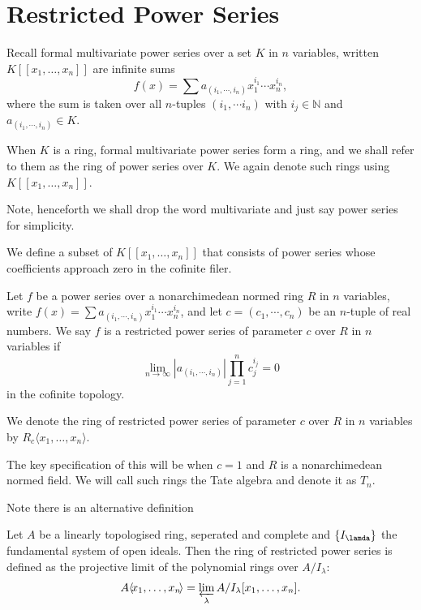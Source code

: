 \chapter{Restricted Power Series}

Recall formal multivariate power series over a set $K$ in $n$ variables, written
$K [ \! [ x_1, \dots, x_n ] \! ]$ are infinite sums
\[
  f(x) = \sum a_{(i_1, \cdots, i_n)} x_1^{i_1} \cdots x_n^{i_n},
\]
where the sum is taken over all $n$-tuples $(i_1, \cdots i_n)$ with $i_j \in \mathbb{N}$ and
$a_{(i_1, \cdots, i_n)} \in K$.

When $K$ is a ring, formal multivariate power series form a ring, and we shall refer to them as the
ring of power series over $K$.  We again denote such rings using $K [ \! [ x_1, \dots, x_n ] \! ]$.

Note, henceforth we shall drop the word multivariate and just say power series for simplicity.

We define a subset of $K [ \! [ x_1, \dots, x_n ] \! ]$ that consists of power series whose coefficients
approach zero in the cofinite filer.

\begin{definition}
  Let $f$ be a power series over a nonarchimedean normed ring $R$ in $n$ variables, write
  $f(x) = \sum a_{(i_1, \cdots, i_n)} x_1^{i_1} \cdots x_n^{i_n}$, and let
  $c = (c_1, \cdots, c_n)$ be an $n$-tuple of real numbers.
  We say $f$ is a restricted power series of parameter $c$ over $R$ in $n$ variables if
  \[
    \lim_{n \to \infty} \left\lvert a_{(i_1, \cdots, i_n)} \right\rvert \prod_{j=1}^{n} c_j^{i_j} = 0
  \]
  in the cofinite topology.

  We denote the ring of restricted power series of parameter $c$ over $R$ in $n$ variables by
  $R_c \langle \! x_1, \dots, x_n \! \rangle$.
\end{definition}

The key specification of this will be when $c = 1$ and $R$ is a nonarchimedean normed field. We will
call such rings the Tate algebra and denote it as $T_n$.

Note there is an alternative definition \cite{...} %

\begin{definition}
  Let $A$ be a linearly topologised ring, seperated and complete and $\{ I_\lamda \}$ the fundamental
  system of open ideals. Then the ring of restricted power series is defined as the projective limit
  of the polynomial rings over $A / I_\lambda$:
  \[
    A \langle \! x_1, \dots, x_n \! \rangle = \varprojlim_\lambda A / I_\lambda [x_1, \dots, x_n].
  \]
\end{definition}

